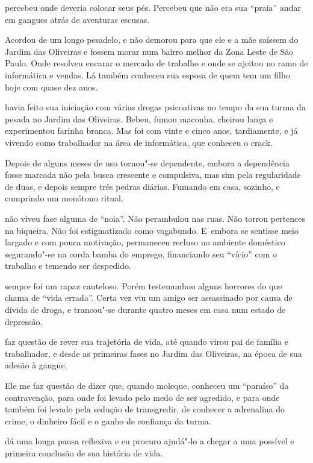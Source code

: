  percebeu onde deveria colocar seus pés. Percebeu que não era sua
``praia'' andar em gangues atrás de aventuras escusas.

Acordou de um longo pesadelo, e não demorou para que ele e a mãe saíssem
do Jardim das Oliveiras e fossem morar num bairro melhor da Zona Leste
de São Paulo. Onde  resolveu encarar o mercado de trabalho e onde se
ajeitou no ramo de informática e vendas. Lá também conheceu sua esposa
de quem tem um filho hoje com quase dez anos.

\asterisc{}

 havia feito sua iniciação com várias drogas psicoativas no tempo da
sua turma da pesada no Jardim das Oliveiras. Bebeu, fumou maconha,
cheirou lança e experimentou farinha branca. Mas foi com vinte e cinco
anos, tardiamente, e já vivendo como trabalhador na área de informática,
que conheceu o crack.

Depois de alguns meses de uso tornou"-se dependente, embora a dependência
fosse marcada não pela busca crescente e compulsiva, mas sim pela
regularidade de duas, e depois sempre três pedras diárias. Fumando em
casa, sozinho, e cumprindo um monótono ritual.

 não viveu fase alguma de ``noia''. Não perambulou nas ruas. Não
torrou pertences na biqueira. Não foi estigmatizado como vagabundo. E~embora se sentisse meio largado e com pouca motivação, permaneceu
recluso no ambiente doméstico segurando"-se na corda bamba do emprego,
financiando seu ``vício'' com o trabalho e temendo ser despedido.

 sempre foi um rapaz cauteloso. Porém testemunhou alguns horrores do
que chama de ``vida errada''. Certa vez viu um amigo ser assassinado por
causa de dívida de droga, e trancou"-se durante quatro meses em casa num
estado de depressão.

\asterisc{}

 faz questão de rever sua trajetória de vida, até quando virou pai de
família e trabalhador, e desde as primeiras fases no Jardim das
Oliveiras, na época de sua adesão à gangue.

Ele me faz questão de dizer que, quando moleque, conheceu um ``paraíso''
da contravenção, para onde foi levado pelo medo de ser agredido, e para
onde também foi levado pela sedução de transgredir, de conhecer a
adrenalina do crime, o dinheiro fácil e o ganho de confiança da turma.

\asterisc{}

 dá uma longa pausa reflexiva e eu procuro ajudá"-lo a chegar a uma
possível e primeira conclusão de sua história de vida.


